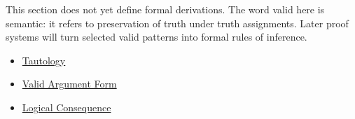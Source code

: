 \begin{remark*}[Exposition]
This section does not yet define formal derivations. The word valid here is
semantic: it refers to preservation of truth under truth assignments. Later proof
systems will turn selected valid patterns into formal rules of inference.
\end{remark*}

\begin{dependencies}
\begin{itemize}
  \item \hyperref[def:tautology-propositional-logic]{Tautology}
  \item \hyperref[def:valid-argument-form-propositional-logic]{Valid Argument Form}
  \item \hyperref[def:logical-consequence-propositional-logic]{Logical Consequence}
\end{itemize}
\end{dependencies}
